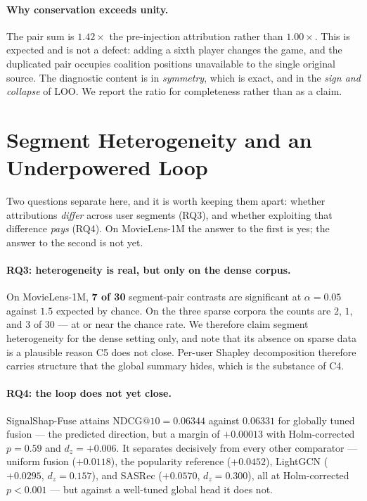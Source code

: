 \documentclass[11pt]{article}
\makeatletter
\newcommand{\NDCG}{\mathrm{NDCG@10}}
\makeatother
\begin{document}
\paragraph{Why conservation exceeds unity.} The pair sum is $1.42\times$ the
pre-injection attribution rather than $1.00\times$. This is expected and is not
a defect: adding a sixth player changes the game, and the duplicated pair
occupies coalition positions unavailable to the single original source. The
diagnostic content is in \emph{symmetry}, which is exact, and in the
\emph{sign and collapse} of LOO. We report the ratio for completeness rather
than as a claim.

\section{Segment Heterogeneity and an Underpowered Loop}\label{sec:negative}

Two questions separate here, and it is worth keeping them apart: whether
attributions \emph{differ} across user segments (RQ3), and whether exploiting
that difference \emph{pays} (RQ4). On MovieLens-1M the answer to the first is
yes; the answer to the second is not yet.

\paragraph{RQ3: heterogeneity is real, but only on the dense corpus.} On
MovieLens-1M, \textbf{7 of 30} segment-pair contrasts are significant at
$\alpha = 0.05$ against $1.5$ expected by chance. On the three sparse corpora
the counts are $2$, $1$, and $3$ of $30$ --- at or near the chance rate. We
therefore claim segment heterogeneity for the dense setting only, and note
that its absence on sparse data is a plausible reason C5 does not close. Per-user Shapley
decomposition therefore carries structure that the global summary hides, which
is the substance of C4.



\paragraph{RQ4: the loop does not yet close.} SignalShap-Fuse attains
$\NDCG = 0.06344$ against $0.06331$ for globally tuned fusion --- the predicted
direction, but a margin of $+0.00013$ with Holm-corrected $p = 0.59$ and
$d_z = +0.006$. It separates decisively from every other comparator --- uniform fusion
($+0.0118$), the popularity reference ($+0.0452$), LightGCN
\citep{he2020lightgcn} ($+0.0295$, $d_z = 0.157$), and SASRec
\citep{kang2018sasrec} ($+0.0570$, $d_z = 0.300$), all at Holm-corrected
$p < 0.001$ --- but against a well-tuned global head it does not.
\end{document}
